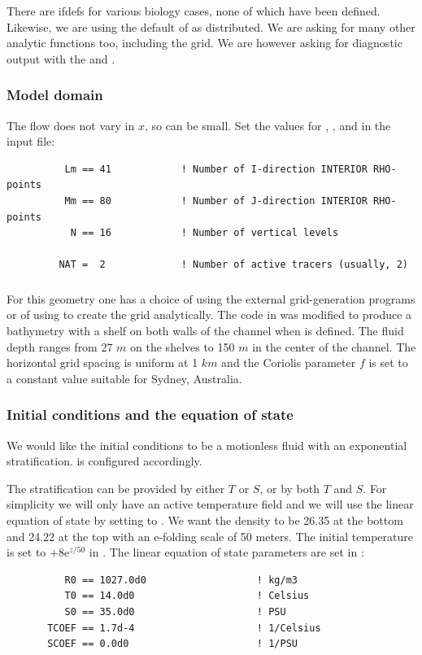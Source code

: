 There are ifdefs for various biology cases, none of which
have been defined. Likewise, we are using the default of
 as distributed. We are asking for many other
analytic functions too, including the grid. We are however asking
for diagnostic output with the  and
.

\subsubsection{Model domain}
The flow does not vary in $x$, so  can be small.
Set the values for , ,  and  in
the input file:
\begin{verbatim}
          Lm == 41            ! Number of I-direction INTERIOR RHO-points
          Mm == 80            ! Number of J-direction INTERIOR RHO-points
           N == 16            ! Number of vertical levels

         NAT =  2             ! Number of active tracers (usually, 2)
\end{verbatim}

\subsubsection{}
For this geometry one has a choice of using the external grid-generation
programs or of using  to create the grid analytically.
The code in  was
modified to produce a bathymetry with a shelf on both walls of the
channel when  is defined.  The fluid depth ranges from
27 $m$ on the shelves to 150 $m$ in the center of the channel.
The horizontal grid spacing is uniform at 1 $km$ and the
Coriolis parameter $f$ is set to a constant value suitable for
Sydney, Australia.

\subsubsection{Initial conditions and the equation of state}
We would like the initial conditions to be a motionless fluid with an
exponential stratification.   is configured
accordingly.

The stratification can be provided by either $T$ or $S$, or by both
$T$ and $S$.  For
simplicity we will only have an active temperature field and we will
use the linear equation of state by setting  to
. We want the density to be 26.35 at
the bottom and 24.22 at the top with an e-folding scale of 50 meters.
The initial temperature is set to $ + 8\mbox{e}^{z/50}$ in
.  The linear equation of state parameters are set
in :
\begin{verbatim}
          R0 == 1027.0d0                   ! kg/m3
          T0 == 14.0d0                     ! Celsius
          S0 == 35.0d0                     ! PSU
       TCOEF == 1.7d-4                     ! 1/Celsius
       SCOEF == 0.0d0                      ! 1/PSU
\end{verbatim}

